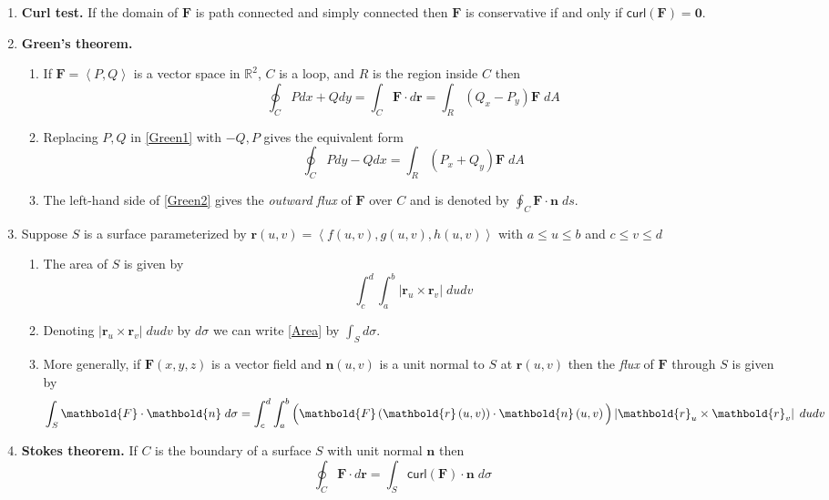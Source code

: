 \documentclass[12pt]{article}
\begin{document}
\begin{enumerate}
\item{\bf Curl test.} If the domain of $\mathbold{F}$
is path connected and simply connected then
$\mathbold{F}$ is conservative if and only if $\mathsf{curl}
\left(\mathbold{F}\right)=\mathbold{0}$.

\item{\bf Green's theorem.}
\begin{enumerate}
\item If $\mathbold{F}=\left\langle P,Q\right\rangle$ is a vector
space in $\mathbb{R}^2$, $C$ is a loop,
and $R$ is the region inside $C$ then
\begin{equation}\label{Green1}
\oint_C Pdx+Qdy
=\int_C\mathbold{F}\cdot d\mathbold{r}
=\int_R\left(Q_x-P_y\right)\mathbold{F}\;dA
\end{equation}
\item Replacing $P,Q$ in \autoref{Green1} with $-Q,P$ gives
the equivalent form
\begin{equation}\label{Green2}
\oint_C Pdy-Qdx
=\int_R\left(P_x+Q_y\right)\mathbold{F}\;dA
\end{equation}
\item The left-hand side of \autoref{Green2} gives
the {\em outward flux} of $\mathbold{F}$ over $C$
and is denoted by $\oint_C\mathbold{F}\cdot\mathbold{n}\;ds$.
\end{enumerate}

\item Suppose $S$ is a surface parameterized by
$\mathbold{r}\left(u,v\right)
=\left\langle f\left(u,v\right),g\left(u,v\right),h\left(u,v\right)
\right\rangle$ with $a\le u\le b$ and $c\le v\le d$
\begin{enumerate}
\item The area of $S$ is given by
\begin{equation}\label{Area}
\int_c^d\int_a^b\left|\mathbold{r}_u\times\mathbold{r}_v
\right|\;dudv
\end{equation}
\item Denoting $\left|\mathbold{r}_u\times\mathbold{r}_v\right|\;dudv$
by $d\sigma$ we can write \autoref{Area} by
$\int_Sd\sigma$.
\item More generally, if $\mathbold{F}\left(x,y,z\right)$
is a vector field and $\mathbold{n}\left(u,v\right)$
is a unit normal to $S$ at $\mathbold{r}\left(u,v\right)$
then the {\em flux} of $\mathbold{F}$ through $S$
is given by
\[\int_S\mathbold{F}\cdot\mathbold{n}\;d\sigma
=\int_c^d\int_a^b\left(
\mathbold{F}\left(\mathbold{r}\left(u,v\right)\right)
\cdot\mathbold{n}\left(u,v\right)\rule{0pt}{12pt}\right)
\left|\mathbold{r}_u\times\mathbold{r}_v
\right|\;dudv\]
\end{enumerate}

\item{\bf Stokes theorem.}
If $C$ is the boundary of a surface $S$
with unit normal $\mathbold{n}$ then
\[\oint_C\mathbold{F}\cdot d\mathbold{r}
=\int_S\mathsf{curl}\left(\mathbold{F}\right)
\cdot\mathbold{n}\;d\sigma\]
\end{enumerate}
\end{document}
